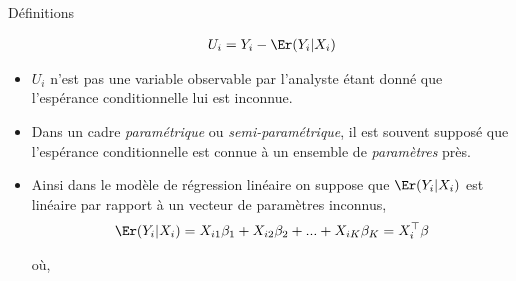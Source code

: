 \begin{frame}[allowframebreaks]{Définitions}
\begin{itemize}
\begin{align}
U_i = Y_i - \Er(Y_i| X_i)
\label{eq1}
\end{align} 
\item $U_i$ n'est pas une variable observable par l'analyste étant donné que l'espérance conditionnelle lui est inconnue.
\item Dans un cadre \emph{paramétrique} ou \emph{semi-paramétrique}, il est souvent supposé que l'espérance conditionnelle est connue à un ensemble de \emph{paramètres} près. 
\item Ainsi dans le modèle de régression linéaire on suppose que $\Er(Y_i|X_i)$ est linéaire par rapport à un vecteur de paramètres inconnus,
\begin{align}
\Er(Y_i|X_i) = X_{i1}\beta_1 +  X_{i2}\beta_2 + ...+ X_{iK}\beta_K = X_i^\top\beta
\label{eq2}
\end{align}

où,


\end{itemize}
\end{frame}
